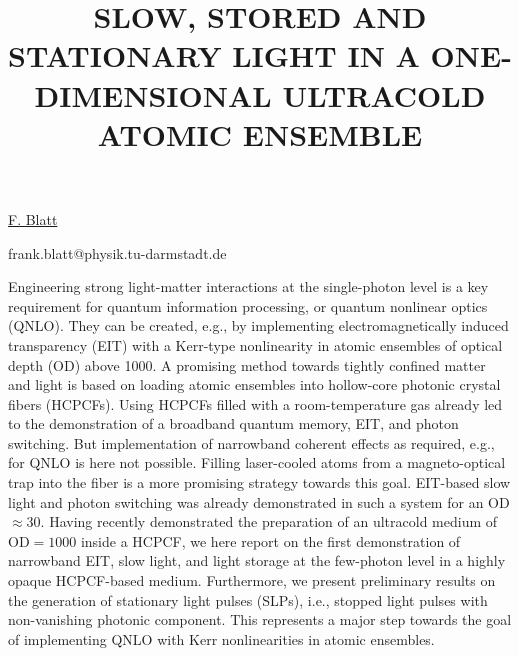 \title{SLOW, STORED AND STATIONARY LIGHT IN A ONE-DIMENSIONAL ULTRACOLD ATOMIC ENSEMBLE}

\underline{F. Blatt} 

{\normalsize{\vspace{-4mm}
\darmstadt

\email frank.blatt@physik.tu-darmstadt.de}}

Engineering strong light-matter interactions at the single-photon level is a key requirement for quantum information processing, or quantum nonlinear optics (QNLO). They can be created, e.g., by implementing electromagnetically induced transparency (EIT) with a Kerr-type nonlinearity in atomic ensembles of optical depth (OD) above 1000. A promising method towards tightly confined matter and light is based on loading atomic ensembles into hollow-core photonic crystal fibers (HCPCFs).
Using HCPCFs filled with a room-temperature gas already led to the demonstration of a broadband quantum memory, EIT, and photon switching. But implementation of narrowband coherent effects as required, e.g., for QNLO is here not possible. Filling laser-cooled atoms from a magneto-optical trap into the fiber is a more promising strategy towards this goal. EIT-based slow light and photon switching was already demonstrated in such a system for an OD$\approx 30$.
Having recently demonstrated the preparation of an ultracold medium of OD$=1000$ inside a HCPCF, we here report on the first demonstration of narrowband EIT, slow light, and light storage at the few-photon level in a highly opaque HCPCF-based medium. Furthermore, we present preliminary results on the generation of stationary light pulses (SLPs), i.e., stopped light pulses with non-vanishing photonic component. This represents a major step towards the goal of implementing QNLO with Kerr nonlinearities in atomic ensembles.

\vspace{\baselineskip}
